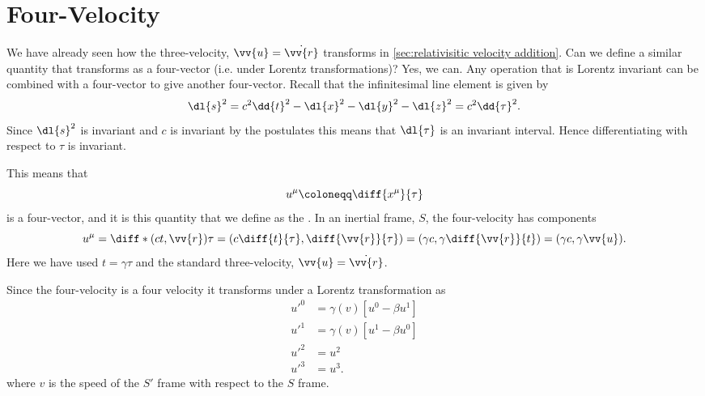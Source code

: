 \documentclass[fleqn]{NotesClass}
\begin{document}
    \section{Four-Velocity}
    We have already seen how the three-velocity, \(\vv{u} = \dot{\vv{r}}\) transforms in \cref{sec:relativisitic velocity addition}.
    Can we define a similar quantity that transforms as a four-vector (i.e. under Lorentz transformations)?
    Yes, we can.
    Any operation that is Lorentz invariant can be combined with a four-vector to give another four-vector.
    Recall that the infinitesimal line element is given by
    \begin{equation}
        \dl{s}^2 = c^2\dd{t}^2 - \dl{x}^2 - \dl{y}^2 - \dl{z}^2 = c^2\dd{\tau}^2.
    \end{equation}
    Since \(\dl{s}^2\) is invariant and \(c\) is invariant by the postulates this means that \(\dl{\tau}\) is an invariant interval.
    Hence differentiating with respect to \(\tau\) is invariant.
    
    This means that
    \begin{equation}
        u^\mu \coloneqq \diff{x^\mu}{\tau}
    \end{equation}
    is a four-vector, and it is this quantity that we define as the .
    In an inertial frame, \(S\), the four-velocity has components
    \begin{equation}
        u^\mu = \diff*{(ct, \vv{r})}{\tau} = \left( c\diff{t}{\tau}, \diff{\vv{r}}{\tau} \right) = \left( \gamma c, \gamma\diff{\vv{r}}{t} \right) = (\gamma c, \gamma\vv{u}).
    \end{equation}
    Here we have used \(t = \gamma\tau\) and the standard three-velocity, \(\vv{u} = \dot{\vv{r}}\).
    
    Since the four-velocity is a four velocity it transforms under a Lorentz transformation as
    \begin{align}
        u'^0 &= \gamma(v)[u^0 - \beta u^1]\\
        u'^1 &= \gamma(v)[u^1 - \beta u^0]\\
        u'^2 &= u^2\\
        u'^3 &= u^3.
    \end{align}
    where \(v\) is the speed of the \(S'\) frame with respect to the \(S\) frame.
    
\end{document}
